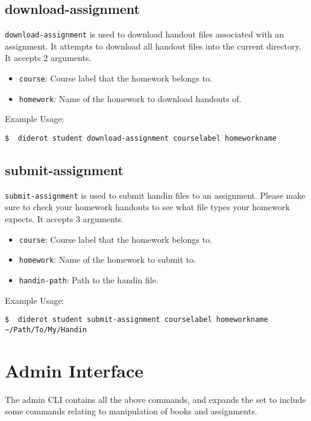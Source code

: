 \subsection{download-assignment}

\verb|download-assignment| is used to download handout files associated with an assignment.
%
It attempts to download all handout files into the current directory.
% 
It accepts 2 arguments.

\begin{itemize}
  \item \verb|course|: Course label that the homework belongs to.
  \item \verb|homework|: Name of the homework to download handouts of.
\end{itemize}

Example Usage:
\begin{verbatim}
$  diderot student download-assignment courselabel homeworkname
\end{verbatim}

\subsection{submit-assignment}

\verb|submit-assignment| is used to submit handin files to an assignment.
%
Please make sure to check your homework handouts to see what file types
your homework expects.
%
It accepts 3 arguments.

\begin{itemize}
  \item \verb|course|: Course label that the homework belongs to.
  \item \verb|homework|: Name of the homework to submit to.
  \item \verb|handin-path|: Path to the handin file.
\end{itemize}

Example Usage:
\begin{verbatim}
$  diderot student submit-assignment courselabel homeworkname ~/Path/To/My/Handin
\end{verbatim}

\section{Admin Interface}

The admin CLI contains all the above commands, and expands the set to include
some commands relating to manipulation of books and assignments.

